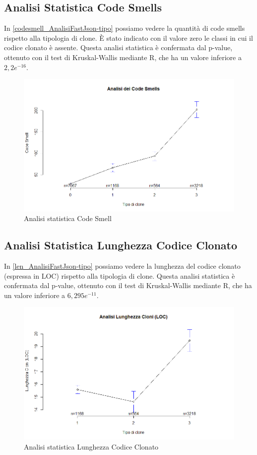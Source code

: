\subsection{Analisi Statistica Code Smells}
In \autoref{codesmell_AnalisiFastJson-tipo} possiamo vedere la quantità di code smells rispetto alla tipologia di clone. È stato indicato con il valore zero le classi in cui il codice clonato è assente. Questa analisi statistica è confermata dal p-value, ottenuto con il test di Kruskal-Wallis mediante R, che ha un valore inferiore a $2,2 e^{-16}$. \newpage
\begin{figure}[htbp]
	\centering
	\includegraphics[scale=0.5]{analisi_R/AnalisiFastJson/2-gplot-codesmell-type.png}
\caption{Analisi statistica Code Smell}
\label{codesmell_AnalisiFastJson-tipo}
\end{figure}


\subsection{Analisi Statistica Lunghezza Codice Clonato}
In \autoref{len_AnalisiFastJson-tipo} possiamo vedere la lunghezza del codice clonato (espressa in LOC) rispetto alla tipologia di clone. Questa analisi statistica è confermata dal p-value, ottenuto con il test di Kruskal-Wallis mediante R, che ha un valore inferiore a $6,295e^{-11}$. \newpage
\begin{figure}[htbp]
	\centering
	\includegraphics[scale=0.5]{analisi_R/AnalisiFastJson/3-gplot-len-type.png}
\caption{Analisi statistica Lunghezza Codice Clonato }
\label{len_AnalisiFastJson-tipo}
\end{figure}

